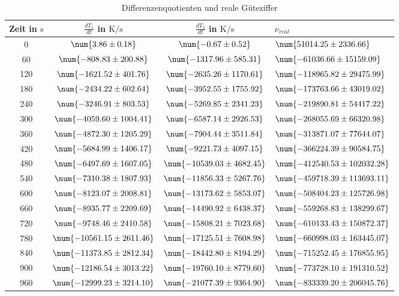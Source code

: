 \begin{table} 
 \centering 
 \begin{tabular}{S S S } 
 \toprule  
{Zeit in $\si{\second}$} & {$\frac{dT_1}{dt}$ in $\si{\kelvin \per \second}$} & {$\frac{dT_2}{dt}$ in $\si{\kelvin \per \second}$} & {$\nu_{real}$} \\ 
 & $\num{ 3.86 \pm 0.18 }$ & $\num{ -0.67 \pm 0.52 }$ & $\num{ 51014.25 \pm 2336.66 }$ \\ 
60 & $\num{ -808.83 \pm 200.88 }$ & $\num{ -1317.96 \pm 585.31 }$ & $\num{ -61036.66 \pm 15159.09 }$ \\ 
120 & $\num{ -1621.52 \pm 401.76 }$ & $\num{ -2635.26 \pm 1170.61 }$ & $\num{ -118965.82 \pm 29475.99 }$ \\ 
180 & $\num{ -2434.22 \pm 602.64 }$ & $\num{ -3952.55 \pm 1755.92 }$ & $\num{ -173763.66 \pm 43019.02 }$ \\ 
240 & $\num{ -3246.91 \pm 803.53 }$ & $\num{ -5269.85 \pm 2341.23 }$ & $\num{ -219890.81 \pm 54417.22 }$ \\ 
300 & $\num{ -4059.60 \pm 1004.41 }$ & $\num{ -6587.14 \pm 2926.53 }$ & $\num{ -268055.69 \pm 66320.98 }$ \\ 
360 & $\num{ -4872.30 \pm 1205.29 }$ & $\num{ -7904.44 \pm 3511.84 }$ & $\num{ -313871.07 \pm 77644.07 }$ \\ 
420 & $\num{ -5684.99 \pm 1406.17 }$ & $\num{ -9221.73 \pm 4097.15 }$ & $\num{ -366224.39 \pm 90584.75 }$ \\ 
480 & $\num{ -6497.69 \pm 1607.05 }$ & $\num{ -10539.03 \pm 4682.45 }$ & $\num{ -412540.53 \pm 102032.28 }$ \\ 
540 & $\num{ -7310.38 \pm 1807.93 }$ & $\num{ -11856.33 \pm 5267.76 }$ & $\num{ -459718.39 \pm 113693.11 }$ \\ 
600 & $\num{ -8123.07 \pm 2008.81 }$ & $\num{ -13173.62 \pm 5853.07 }$ & $\num{ -508404.23 \pm 125726.98 }$ \\ 
660 & $\num{ -8935.77 \pm 2209.69 }$ & $\num{ -14490.92 \pm 6438.37 }$ & $\num{ -559268.83 \pm 138299.67 }$ \\ 
720 & $\num{ -9748.46 \pm 2410.58 }$ & $\num{ -15808.21 \pm 7023.68 }$ & $\num{ -610133.43 \pm 150872.37 }$ \\ 
780 & $\num{ -10561.15 \pm 2611.46 }$ & $\num{ -17125.51 \pm 7608.98 }$ & $\num{ -660998.03 \pm 163445.07 }$ \\ 
840 & $\num{ -11373.85 \pm 2812.34 }$ & $\num{ -18442.80 \pm 8194.29 }$ & $\num{ -715252.45 \pm 176855.95 }$ \\ 
900 & $\num{ -12186.54 \pm 3013.22 }$ & $\num{ -19760.10 \pm 8779.60 }$ & $\num{ -773728.10 \pm 191310.52 }$ \\ 
960 & $\num{ -12999.23 \pm 3214.10 }$ & $\num{ -21077.39 \pm 9364.90 }$ & $\num{ -833339.20 \pm 206045.76 }$ \\ 
\bottomrule 
 \end{tabular} 
 \caption{Differenzenquotienten und reale Güteziffer} 
 \label{tab: dTdt} 
  \end{table}